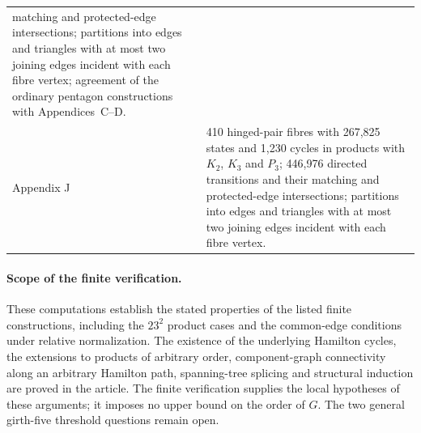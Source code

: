 \documentclass[11pt]{article}
\theoremstyle{remark}
\numberwithin{equation}{section}
\numberwithin{table}{section}
\begin{document}
\begin{table}[htbp]
\begin{tabularx}{\linewidth}{@{}lX@{}}
matching and protected-edge intersections; partitions into edges and
triangles with at most two joining edges incident with each fibre vertex; agreement of the ordinary
pentagon constructions with Appendices~C--D.\\
Appendix J & 410 hinged-pair fibres with 267,825 states and 1,230 cycles
in products with $K_2$, $K_3$ and $P_3$; 446,976 directed transitions and
their matching and protected-edge intersections; partitions into edges
and triangles with at most two joining edges incident with each fibre vertex.\\
\bottomrule
\end{tabularx}
\end{table}

\paragraph{Scope of the finite verification.}
These computations establish the stated properties of the listed finite
constructions, including the $23^2$ product cases and the common-edge
conditions under relative normalization. The existence of the underlying
Hamilton cycles, the extensions to products of arbitrary order,
component-graph connectivity along an arbitrary Hamilton path,
spanning-tree splicing and structural induction are proved in the
article. The finite verification supplies the local hypotheses of these
arguments; it imposes no upper bound on the order of $G$. The two
general girth-five threshold questions remain open.
\end{document}
